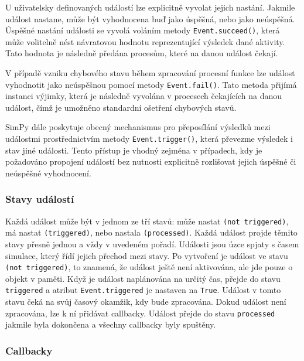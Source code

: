 \documentclass[12pt,a4paper]{article}
\begin{document}
U uživatelsky definovaných událostí lze explicitně vyvolat jejich nastání. Jakmile událost nastane, může být vyhodnocena buď jako úspěšná, nebo jako neúspěšná. Úspěšné nastání události se vyvolá voláním metody \texttt{Event.succeed()}, která může volitelně nést návratovou hodnotu reprezentující výsledek dané aktivity. Tato hodnota je následně předána procesům, které na danou událost čekají.

V případě vzniku chybového stavu během zpracování procesní funkce lze událost vyhodnotit jako neúspěšnou pomocí metody \texttt{Event.fail()}. Tato metoda přijímá instanci výjimky, která je následně vyvolána v procesech čekajících na danou událost, čímž je umožněno standardní ošetření chybových stavů.

SimPy dále poskytuje obecný mechanismus pro přeposílání výsledků mezi událostmi prostřednictvím metody \texttt{Event.trigger()}, která převezme výsledek i stav jiné události. Tento přístup je vhodný zejména v případech, kdy je požadováno propojení událostí bez nutnosti explicitně rozlišovat jejich úspěšné či neúspěšné vyhodnocení.

\subsubsection{Stavy událostí}

Každá událost může být v jednom ze tří stavů: může nastat \texttt{(not triggered)}, má nastat \texttt{(triggered)}, nebo nastala \texttt{(processed)}. Každá událost projde těmito stavy přesně jednou a vždy v uvedeném pořadí. Události jsou úzce spjaty s časem simulace, který řídí jejich přechod mezi stavy. Po vytvoření je událost ve stavu \texttt{(not triggered)}, to znamená, že událost ještě není aktivována, ale jde pouze o objekt v paměti. Když je událost naplánována na určitý čas, přejde do stavu \texttt{triggered} a atribut \texttt{Event.triggered} je nastaven na \texttt{True}. Událost v tomto stavu čeká na svůj časový okamžik, kdy bude zpracována. Dokud událost není zpracována, lze k ní přidávat callbacky. Událost přejde do stavu  \texttt{processed} jakmile byla dokončena a všechny callbacky byly spuštěny.

\subsubsection{Callbacky}
\end{document}
